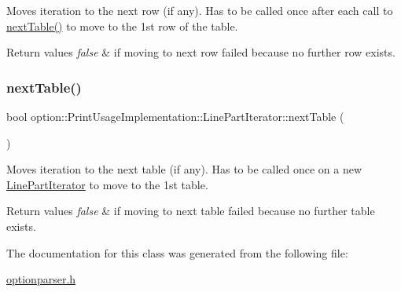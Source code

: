 Moves iteration to the next row (if any). Has to be called once after each call to \hyperlink{classoption_1_1PrintUsageImplementation_1_1LinePartIterator_afe43ca12d399ed3c871e4dc5bf63356e}{next\+Table()} to move to the 1st row of the table. 


\begin{DoxyRetVals}{Return values}
{\em false} & if moving to next row failed because no further row exists. \\
\hline
\end{DoxyRetVals}
\mbox{\label{classoption_1_1PrintUsageImplementation_1_1LinePartIterator_afe43ca12d399ed3c871e4dc5bf63356e}} 
\subsubsection{\texorpdfstring{next\+Table()}{nextTable()}}
{\footnotesize\ttfamily bool option\+::\+Print\+Usage\+Implementation\+::\+Line\+Part\+Iterator\+::next\+Table (\begin{DoxyParamCaption}{ }\end{DoxyParamCaption})\hspace{0.3cm}{\ttfamily [inline]}}



Moves iteration to the next table (if any). Has to be called once on a new \hyperlink{classoption_1_1PrintUsageImplementation_1_1LinePartIterator}{Line\+Part\+Iterator} to move to the 1st table. 


\begin{DoxyRetVals}{Return values}
{\em false} & if moving to next table failed because no further table exists. \\
\hline
\end{DoxyRetVals}


The documentation for this class was generated from the following file\+:\begin{DoxyCompactItemize}
\item 
\hyperlink{optionparser_8h}{optionparser.\+h}\end{DoxyCompactItemize}
